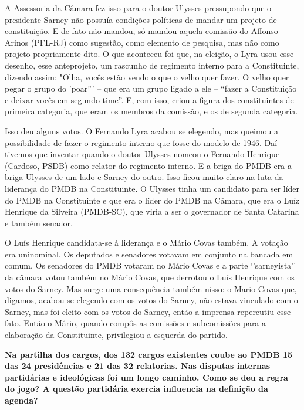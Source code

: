 A Assessoria da Câmara fez isso para o doutor Ulysses pressupondo que o
presidente Sarney não possuía condições políticas de mandar um projeto
de constituição. E de fato não mandou, só mandou aquela comissão do
Affonso Arinos (PFL-RJ) como sugestão, como elemento de pesquisa, mas
não como projeto propriamente dito. O que aconteceu foi que, na eleição,
o Lyra usou esse desenho, esse anteprojeto, um rascunho de regimento
interno para a Constituinte, dizendo assim: "Olha, vocês estão vendo o
que o velho quer fazer. O velho quer pegar o grupo do 'poar''' -- que
era um grupo ligado a ele -- ``fazer a Constituição e deixar vocês em
segundo time''. E, com isso, criou a figura dos constituintes de
primeira categoria, que eram os membros da comissão, e os de segunda
categoria.

Isso deu alguns votos. O Fernando Lyra acabou se elegendo, mas queimou a
possibilidade de fazer o regimento interno que fosse do modelo de 1946.
Daí tivemos que inventar quando o doutor Ulysses nomeou o Fernando
Henrique (Cardoso, PSDB) como relator do regimento interno. E a briga do
PMDB era a briga Ulysses de um lado e Sarney do outro. Isso ficou muito
claro na luta da liderança do PMDB na Constituinte. O Ulysses tinha um
candidato para ser líder do PMDB na Constituinte e que era o líder do
PMDB na Câmara, que era o Luíz Henrique da Silveira (PMDB-SC), que viria
a ser o governador de Santa Catarina e também senador.

O Luís Henrique candidata-se à liderança e o Mário Covas também. A
votação era uninominal. Os deputados e senadores votavam em conjunto na
bancada em comum. Os senadores do PMDB votaram no Mário Covas e a parte
`'sarneyista'' da câmara votou também no Mário Covas, que derrotou o
Luís Henrique com os votos do Sarney. Mas surge uma consequência também
nisso: o Mario Covas que, digamos, acabou se elegendo com os votos do
Sarney, não estava vinculado com o Sarney, mas foi eleito com os votos
do Sarney, então a imprensa repercutiu esse fato. Então o Mário, quando
compôs as comissões e subcomissões para a elaboração da Constituinte,
privilegiou a esquerda do partido.

\textbf{Na partilha dos cargos, dos 132 cargos existentes coube ao PMDB
15 das 24 presidências e 21 das 32 relatorias. Nas disputas internas
partidárias e ideológicas foi um longo caminho. Como se deu a regra do
jogo? A questão partidária exercia influencia na definição da agenda?}

